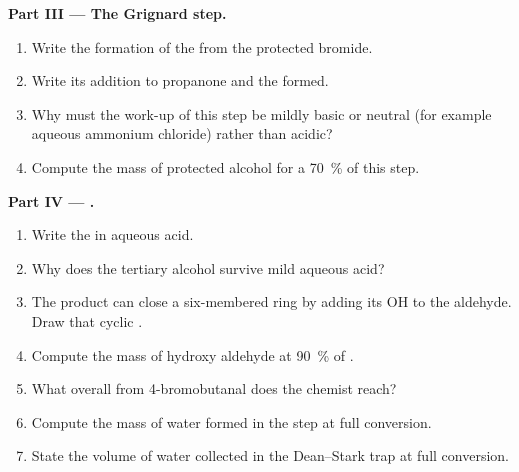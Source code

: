 \begin{problem}
\medskip
\noindent\textbf{Part III --- The Grignard step.}
\begin{enumerate}[resume]
  \item Write the formation of the  from the protected
        bromide.
  \item Write its addition to propanone and the  formed.
  \item Why must the work-up of this step be mildly basic or neutral (for
        example aqueous ammonium chloride) rather than acidic?
  \item Compute the mass of protected alcohol for a \qty{70}{\percent} 
        of this step.
\end{enumerate}

\medskip
\noindent\textbf{Part IV --- .}
\begin{enumerate}[resume]
  \item Write the  in aqueous acid.
  \item Why does the tertiary alcohol survive mild aqueous acid?
  \item The product can close a six-membered ring by adding its OH to the
        aldehyde. Draw that cyclic .
  \item Compute the mass of hydroxy aldehyde at \qty{90}{\percent}  of
        .
  \item What overall  from 4-bromobutanal does the chemist reach?
  \item Compute the mass of water formed in the  step at full
        conversion.
  \item State the volume of water collected in the Dean--Stark trap at full
        conversion.
\end{enumerate}
\end{problem}
